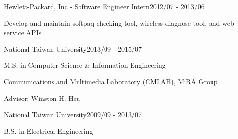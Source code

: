 \documentclass{joel_cv}
\begin{document}

\begin{profExp}{Hewlett-Packard, Inc - Software Engineer Intern}{2012/07 - 2013/06}
	\item Develop and maintain softpaq checking tool, wireless diagnose tool, and web service APIs
\end{profExp}

%
%


%
%

\begin{sectionContentSimple}{National Taiwan University}{2013/09 - 2015/07}
	\item M.S. in Computer Science \& Information Engineering
	\item Communications and Multimedia Laboratory (CMLAB), MiRA Group
	\item Advisor: Winston H. Hsu
\end{sectionContentSimple}

\begin{sectionContentSimple}{National Taiwan University}{2009/09 - 2013/07}
	\item B.S. in Electrical Engineering
\end{sectionContentSimple}

%
%
\end{document}
